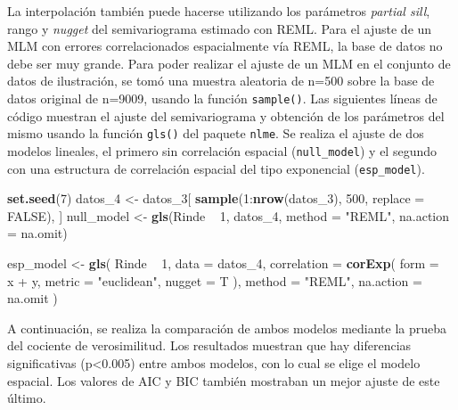 \documentclass[11pt,b5paper,]{krantz}
\newenvironment{Shaded}{}{}
\newcommand{\DataTypeTok}[1]{\textcolor[rgb]{0.56,0.13,0.00}{#1}}
\newcommand{\DecValTok}[1]{\textcolor[rgb]{0.25,0.63,0.44}{#1}}
\newcommand{\KeywordTok}[1]{\textcolor[rgb]{0.00,0.44,0.13}{\textbf{#1}}}
\newcommand{\NormalTok}[1]{#1}
\newcommand{\OperatorTok}[1]{\textcolor[rgb]{0.40,0.40,0.40}{#1}}
\newcommand{\OtherTok}[1]{\textcolor[rgb]{0.00,0.44,0.13}{#1}}
\newcommand{\StringTok}[1]{\textcolor[rgb]{0.25,0.44,0.63}{#1}}
\begin{document}
La interpolación también puede hacerse utilizando los parámetros \emph{partial sill}, rango y \emph{nugget} del semivariograma estimado con REML. Para el ajuste de un MLM con errores correlacionados espacialmente vía REML, la base de datos no debe ser muy grande. Para poder realizar el ajuste de un MLM en el conjunto de datos de ilustración, se tomó una muestra aleatoria de n=500 sobre la base de datos original de n=9009, usando la función \texttt{sample()}. Las siguientes líneas de código muestran el ajuste del semivariograma y obtención de los parámetros del mismo usando la función \texttt{gls()} del paquete \texttt{nlme}. Se realiza el ajuste de dos modelos lineales, el primero sin correlación espacial (\texttt{null\_model}) y el segundo con una estructura de correlación espacial del tipo exponencial (\texttt{esp\_model}).

\begin{Shaded}
\begin{Highlighting}[]
\KeywordTok{set.seed}\NormalTok{(}\DecValTok{7}\NormalTok{)}
\NormalTok{datos_}\DecValTok{4}\NormalTok{ <-}\StringTok{ }\NormalTok{datos_}\DecValTok{3}\NormalTok{[}
  \KeywordTok{sample}\NormalTok{(}\DecValTok{1}\OperatorTok{:}\KeywordTok{nrow}\NormalTok{(datos_}\DecValTok{3}\NormalTok{), }
         \DecValTok{500}\NormalTok{, }\DataTypeTok{replace =} \OtherTok{FALSE}\NormalTok{), ]}
\NormalTok{null_model <-}
\StringTok{  }\KeywordTok{gls}\NormalTok{(Rinde }\OperatorTok{~}\StringTok{ }\DecValTok{1}\NormalTok{, datos_}\DecValTok{4}\NormalTok{, }
      \DataTypeTok{method =} \StringTok{"REML"}\NormalTok{, }
      \DataTypeTok{na.action =}\NormalTok{ na.omit)}

\NormalTok{esp_model <-}\StringTok{ }\KeywordTok{gls}\NormalTok{(}
\NormalTok{  Rinde }\OperatorTok{~}\StringTok{ }\DecValTok{1}\NormalTok{,}
  \DataTypeTok{data =}\NormalTok{ datos_}\DecValTok{4}\NormalTok{,}
  \DataTypeTok{correlation =} \KeywordTok{corExp}\NormalTok{(}
    \DataTypeTok{form =}  \OperatorTok{~}\StringTok{ }\NormalTok{x }\OperatorTok{+}\StringTok{ }\NormalTok{y,}
    \DataTypeTok{metric =} \StringTok{"euclidean"}\NormalTok{,}
    \DataTypeTok{nugget =}\NormalTok{ T}
\NormalTok{  ),}
  \DataTypeTok{method =} \StringTok{"REML"}\NormalTok{,}
  \DataTypeTok{na.action =}\NormalTok{ na.omit}
\NormalTok{)}
\end{Highlighting}
\end{Shaded}

A continuación, se realiza la comparación de ambos modelos mediante la prueba del cociente de verosimilitud. Los resultados muestran que hay diferencias significativas (p\textless{}0.005) entre ambos modelos, con lo cual se elige el modelo espacial. Los valores de AIC y BIC también mostraban un mejor ajuste de este último.
\end{document}
